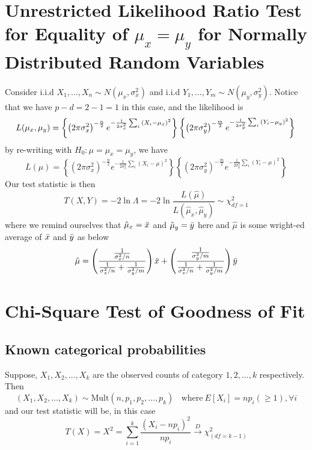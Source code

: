 \documentclass{article}
\begin{document}
\section{Unrestricted Likelihood Ratio Test for Equality of $\mu_x = \mu_y$ for Normally Distributed Random Variables}
Consider i.i.d $X_1,\ldots,X_n \sim N(\mu_x, \sigma_x^2)$ and i.i.d $Y_1,\ldots,Y_m \sim N(\mu_y, \sigma_y^2)$. Notice that we have $p-d = 2 - 1 = 1$ in this case, and the likelihood is
\begin{equation*}
    L(\mu_x, \mu_y) = \left\{\left(2\pi \sigma_x^2\right)^{-\frac{n}{2}}e^{-\frac{1}{2\sigma_x^2}\sum_i{\left(X_i - \mu_x\right)^2}}\right\} \left\{\left(2\pi \sigma_y^2\right)^{-\frac{m}{2}}e^{-\frac{1}{2\sigma_y^2}\sum_i{\left(Y_i - \mu_y\right)^2}}\right\} \\
\end{equation*}    
by re-writing with $H_0: \mu = \mu_x = \mu_y$, we have
\begin{equation*}
    L(\mu) = \left\{\left(2\pi \sigma_x^2\right)^{-\frac{n}{2}}e^{-\frac{1}{2\sigma_x^2}\sum_i{\left(X_i - \mu\right)^2}}\right\} \left\{\left(2\pi \sigma_y^2\right)^{-\frac{m}{2}}e^{-\frac{1}{2\sigma_y^2}\sum_i{\left(Y_i - \mu\right)^2}}\right\}
\end{equation*}
Our test statistic is then
\begin{equation*}
    T(X,Y) = -2 \ln \Lambda = -2 \ln \frac{L(\hat{\mu})}{L(\hat{\mu}_x, \hat{\mu}_y)} \sim \chi^2_{df = 1}
\end{equation*}
where we remind ourselves that $\hat{\mu}_x = \Bar{x}$ and $\hat{\mu}_y = \Bar{y}$ here and $\hat{\mu}$ is some wright-ed average of $\Bar{x}$ and $\Bar{y}$ as below
\begin{equation*}
    \hat{\mu} = \left( \frac{\frac{1}{\sigma^2_x/n}}{ \frac{1}{\sigma^2_x/n} + \frac{1}{\sigma^2_y/m} }\right)\Bar{x} + \left( \frac{\frac{1}{\sigma^2_y/m}}{ \frac{1}{\sigma^2_x/n} + \frac{1}{\sigma^2_y/m} }\right)\Bar{y}
\end{equation*}

\section{Chi-Square Test of Goodness of Fit}
\subsection{Known categorical probabilities}
Suppose, $X_1, X_2, \ldots, X_k$ are the observed counts of category $1, 2, \ldots, k$ respectively. Then
\begin{equation*}
    (X_1, X_2, \ldots, X_k) \sim \text{Mult}(n, p_1, p_2, \ldots, p_k)~~~~\text{where}~E[X_i] = np_i (\geq 1), \forall i
\end{equation*}
and our test statistic will be, in this case
\begin{equation*}
    T(X) = X^2 = \sum_{i = 1}^k \frac{\left(X_i - np_i\right)^2}{np_i} \xrightarrow{D} \chi^2_{(df=k-1)}
\end{equation*}
\end{document}
